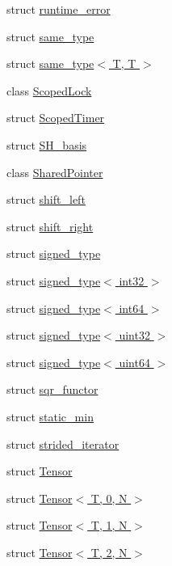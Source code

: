 \begin{DoxyCompactItemize}
\item 
struct \hyperlink{structcugar_1_1runtime__error}{runtime\+\_\+error}
\item 
struct \hyperlink{structcugar_1_1same__type}{same\+\_\+type}
\item 
struct \hyperlink{structcugar_1_1same__type_3_01_t_00_01_t_01_4}{same\+\_\+type$<$ T, T $>$}
\item 
class \hyperlink{classcugar_1_1_scoped_lock}{Scoped\+Lock}
\item 
struct \hyperlink{structcugar_1_1_scoped_timer}{Scoped\+Timer}
\item 
struct \hyperlink{structcugar_1_1_s_h__basis}{S\+H\+\_\+basis}
\item 
class \hyperlink{classcugar_1_1_shared_pointer}{Shared\+Pointer}
\item 
struct \hyperlink{structcugar_1_1shift__left}{shift\+\_\+left}
\item 
struct \hyperlink{structcugar_1_1shift__right}{shift\+\_\+right}
\item 
struct \hyperlink{structcugar_1_1signed__type}{signed\+\_\+type}
\item 
struct \hyperlink{structcugar_1_1signed__type_3_01int32_01_4}{signed\+\_\+type$<$ int32 $>$}
\item 
struct \hyperlink{structcugar_1_1signed__type_3_01int64_01_4}{signed\+\_\+type$<$ int64 $>$}
\item 
struct \hyperlink{structcugar_1_1signed__type_3_01uint32_01_4}{signed\+\_\+type$<$ uint32 $>$}
\item 
struct \hyperlink{structcugar_1_1signed__type_3_01uint64_01_4}{signed\+\_\+type$<$ uint64 $>$}
\item 
struct \hyperlink{structcugar_1_1sqr__functor}{sqr\+\_\+functor}
\item 
struct \hyperlink{structcugar_1_1static__min}{static\+\_\+min}
\item 
struct \hyperlink{structcugar_1_1strided__iterator}{strided\+\_\+iterator}
\item 
struct \hyperlink{structcugar_1_1_tensor}{Tensor}
\item 
struct \hyperlink{structcugar_1_1_tensor_3_01_t_00_010_00_01_n_01_4}{Tensor$<$ T, 0, N $>$}
\item 
struct \hyperlink{structcugar_1_1_tensor_3_01_t_00_011_00_01_n_01_4}{Tensor$<$ T, 1, N $>$}
\item 
struct \hyperlink{structcugar_1_1_tensor_3_01_t_00_012_00_01_n_01_4}{Tensor$<$ T, 2, N $>$}
\item 

\end{DoxyCompactItemize}
